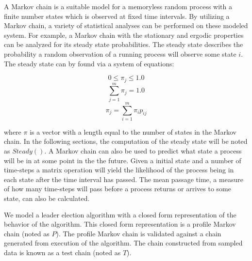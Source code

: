 A Markov chain is a suitable model for a memoryless random process with a finite number states which is observed at fixed time intervals.
By utilizing a Markov chain, a variety of statistical analyses can be performed on these modeled system.
For example, a Markov chain with the stationary and ergodic properties can be analyzed for its steady state probabilities.
The steady state describes the probability a random observation of a running process will observe some state $i$.
The steady state can by found via a system of equations: \cite{MARKOV3}

\[  0\leq\pi_j\leq1.0 \]
\[	\sum_{j = 1}^{m}\pi_j = 1.0 \]
\[	\pi_j = \sum_{i=1}^{m} \pi_i p_{ij} \]

where $\pi$ is a vector with a length equal to the number of states in the Markov chain.
In the following sections, the computation of the steady state will be noted as $Steady()$.
A Markov chain can also be used to predict what state a process will be in at some point in the the future.
Given a initial state and a number of time-steps a matrix operation will yield the likelihood of the process being in each state after the time interval has passed.
The mean passage time, a measure of how many time-steps will pass before a process returns or arrives to some state, can also be calculated.

We model a leader election algorithm with a closed form representation of the behavior of the algorithm.
This closed form representation is a profile Markov chain (noted as $P$).
The profile Markov chain is validated against a chain generated from execution of the algorithm.
The chain constructed from sampled data is known as a test chain (noted as $T$).

